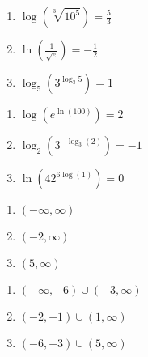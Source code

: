 \begin{multicols}{3}
\begin{enumerate}
\setcounter{enumi}{\value{HW}}


\item  $\log\left( \sqrt[3]{10^5} \right) = \frac{5}{3}$
\item  $\ln \left( \frac{1}{\sqrt{e}}\right) = -\frac{1}{2} $
\item $\log_{5} \left(3^{\log_{3} 5}\right) = 1$

\setcounter{HW}{\value{enumi}}
\end{enumerate}
\end{multicols}

\begin{multicols}{3}
\begin{enumerate}
\setcounter{enumi}{\value{HW}}


\item $\log\left(e^{\ln(100)}\right) = 2$
\item $\log_{2}\left(3^{-\log_{3}(2)}\right) = -1$
\item $\ln\left(42^{6\log(1)}\right) = 0$

\setcounter{HW}{\value{enumi}}
\end{enumerate}
\end{multicols}


\begin{multicols}{3}
\begin{enumerate}
\setcounter{enumi}{\value{HW}}


\item $(-\infty, \infty)$
\item $(-2, \infty)$
\item $(5, \infty)$

\setcounter{HW}{\value{enumi}}
\end{enumerate}
\end{multicols}


\begin{multicols}{3}
\begin{enumerate}
\setcounter{enumi}{\value{HW}}


\item $(-\infty, -6) \cup (-3, \infty)$
\item $(-2, -1) \cup (1, \infty)$
\item $(-6,-3) \cup (5, \infty)$

\setcounter{HW}{\value{enumi}}
\end{enumerate}
\end{multicols}


